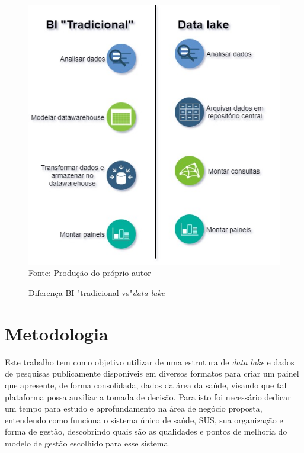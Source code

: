 \documentclass[
	12pt,				%
	openright,			%
	oneside,			%
	a4paper,			%
	chapter=TITLE,		%
	section=TITLE,		%
	subsection=TITLE,	%
	subsubsection=TITLE,%
	english,			%
	brazil				%
	]{abntex2}
\theoremstyle{definition}
\begin{document}
    \begin{figure}[H]
         \centering
         \caption{Diferença BI "tradicional vs"\textit{data lake}}
         \includegraphics[scale=0.7]{imagens/bi_x_datalake.jpg}
         \\{\footnotesize Fonte: Produção do próprio autor}
         \label{diferenca bi datalake}
    \end{figure}

\chapter{Metodologia}
    
    Este trabalho tem como objetivo utilizar de uma estrutura de \textit{data lake} e dados de pesquisas publicamente disponíveis em diversos formatos para criar um painel que apresente, de forma consolidada, dados da área da saúde, visando que tal plataforma possa auxiliar a tomada de decisão.
    Para isto foi necessário dedicar um tempo para estudo e aprofundamento na área de negócio proposta, entendendo como funciona o sistema único de saúde, SUS, sua organização e forma de gestão, descobrindo quais são as qualidades e pontos de melhoria do modelo de gestão escolhido para esse sistema. 
    
\end{document}
